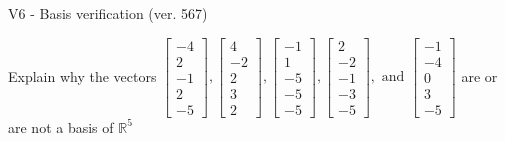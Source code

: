 \begin{exercise}
  \begin{exerciseTitle}V6 - Basis verification (ver. 567)\end{exerciseTitle}
  \begin{exerciseStatement}
    Explain why the vectors \(\left[\begin{array}{r}
-4 \\
2 \\
-1 \\
2 \\
-5
\end{array}\right] , \left[\begin{array}{r}
4 \\
-2 \\
2 \\
3 \\
2
\end{array}\right] , \left[\begin{array}{r}
-1 \\
1 \\
-5 \\
-5 \\
-5
\end{array}\right] , \left[\begin{array}{r}
2 \\
-2 \\
-1 \\
-3 \\
-5
\end{array}\right] , \text{ and } \left[\begin{array}{r}
-1 \\
-4 \\
0 \\
3 \\
-5
\end{array}\right]\) are or are not a basis of \(\mathbb{R}^5\)	



\end{exerciseStatement}
\end{exercise}
